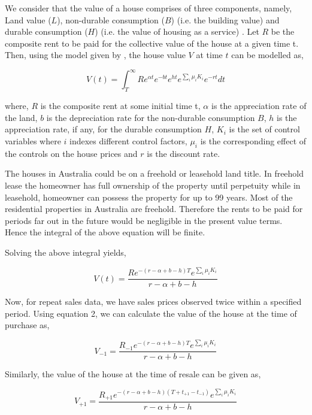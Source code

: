 \documentclass[AEJ,reqno, draftmode]{AEA} %
\begin{document}
We consider that the value of a house comprises of three components, namely, Land value ($L$), non-durable consumption ($B$) (i.e. the building value) and durable consumption ($H$) (i.e. the value of housing as a service) \citep{flavin2008model}. Let $R$ be the composite rent to be paid for the collective value of the house at a given time t. Then, using the model given by \citet{kiel1995effect}, the house value $V$ at time $t$ can be modelled as,

\begin{equation}
    V(t) = \int_{T}^{\infty} R e^{\alpha t} e^{-bt} e^{ht} e^{\sum_{i} \mu_i K_i} e^{-rt} dt
\end{equation}

where, $R$ is the composite rent at some initial time t, $\alpha$ is the appreciation rate of the land, $b$ is the depreciation rate for the non-durable consumption $B$, $h$ is the appreciation rate, if any, for the durable consumption $H$, $K_i$ is the set of control variables where $i$ indexes different control factors, $\mu_i$ is the corresponding effect of the controls on the house prices and $r$ is the discount rate. 

The houses in Australia could be on a freehold or leasehold land title. In freehold lease the homeowner has full ownership of the property until perpetuity while in leasehold, homeowner can possess the property for up to 99 years. Most of the residential properties in Australia are freehold. Therefore the rents to be paid for periods far out in the future would be negligible in the present value terms. Hence the integral of the above equation will be finite. 

Solving the above integral yields,

\begin{equation}
    V(t) = \frac{R e^{-(r-\alpha+b-h)T} e^{\sum_{i} \mu_i K_i}}{r-\alpha+b-h}
\end{equation}

Now, for repeat sales data, we have sales prices observed twice within a specified period. Using equation 2, we can calculate the value of the house at the time of purchase as,

\begin{equation}
    V_{-1} = \frac{R_{-1} e^{-(r-\alpha+b-h)T} e^{\sum_{i} \mu_i K_i}}{r-\alpha+b-h}
\end{equation}

Similarly, the value of the house at the time of resale can be given as,

\begin{equation}
    V_{+1} = \frac{R_{+1} e^{-(r-\alpha+b-h)(T+t_{+1}-t_{-1})} e^{\sum_{i} \mu_i K_i}}{r-\alpha+b-h}
\end{equation}
\end{document}
